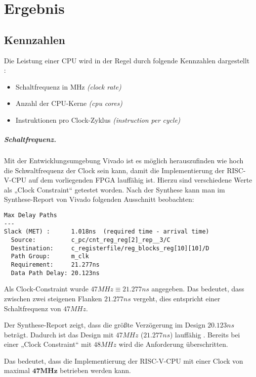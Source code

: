 \chapter{Ergebnis} %
\label{Ergebnis} %

\section{Kennzahlen}
Die Leistung einer CPU wird in der Regel durch folgende Kennzahlen
dargestellt \cite[S. 43]{Hennessy}:
\begin{itemize}
    \item Schaltfrequenz in MHz \emph{(clock rate)}
    \item Anzahl der CPU-Kerne \emph{(cpu cores)}
    \item Instruktionen pro Clock-Zyklus \emph{(instruction per cycle)} 
\end{itemize}

\paragraph{Schaltfrequenz.} Mit der Entwicklungsumgebung Vivado ist es
möglich herauszufinden wie hoch die Schwaltfrequenz der Clock sein kann,
damit die Implementierung der RISC-V-CPU auf dem vorliegenden FPGA
lauffähig ist. Hierzu sind verschiedene Werte als „Clock Constraint“
getestet worden. Nach der Synthese kann man im Synthese-Report von
Vivado folgenden Ausschnitt beobachten: 
\begin{lstlisting}
Max Delay Paths
---
Slack (MET) :      1.018ns  (required time - arrival time)
  Source:          c_pc/cnt_reg_reg[2]_rep__3/C
  Destination:     c_registerfile/reg_blocks_reg[10][10]/D
  Path Group:      m_clk
  Requirement:     21.277ns  
  Data Path Delay: 20.123ns  
\end{lstlisting}
Als Clock-Constraint wurde $47 MHz \equiv 21.277ns$ angegeben.
Das bedeutet, dass zwischen zwei steigenen Flanken $21.277ns$ vergeht,
dies entspricht einer Schaltfrequenz von $47 MHz$.

Der Synthese-Report zeigt, dass die größte Verzögerung im Design
$20.123ns$ beträgt. Dadurch ist das Design mit $47 MHz$ ($21.277ns$) lauffähig 
.
Bereits bei einer „Clock Constraint“ mit $48 MHz$ wird die Anforderung
überschritten.

Das bedeutet, dass die Implementierung der RISC-V-CPU mit einer Clock
von maximal $\mathbf{47 MHz}$ betrieben werden kann.

